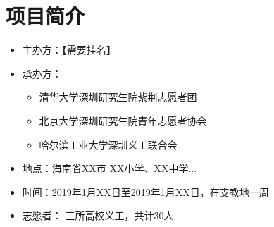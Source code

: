 \documentclass[12pt]{ctexart}
\begin{document}
\section{项目简介}
\begin{itemize}
\item 主办方：【需要挂名】
\item 承办方：
\begin{itemize}
\item 清华大学深圳研究生院紫荆志愿者团
\item 北京大学深圳研究生院青年志愿者协会
\item 哈尔滨工业大学深圳义工联合会
\end{itemize}
\item 地点：海南省XX市 XX小学、XX中学...
\item 时间：2019年1月XX日至2019年1月XX日，在支教地一周
\item 志愿者： 三所高校义工，共计30人
\end{itemize}
\end{document}
